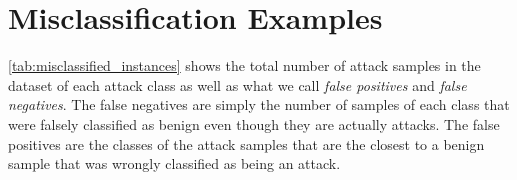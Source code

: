 \documentclass[sigconf,nonacm]{acmart}
\begin{document}
\begin{table}
\begin{tabular}{l r r}

\bottomrule
\end{tabular}
\end{table}





\section{Misclassification Examples}
\autoref{tab:misclassified_instances} shows the total number of attack samples in the dataset of each attack class as well as what we call \textit{false positives} and \textit{false negatives}. The false negatives are simply the number of samples of each class that were falsely classified as benign even though they are actually attacks. 
The false positives are the classes of the attack samples that are the closest to a benign sample that was wrongly classified as being an attack. 
\end{document}

